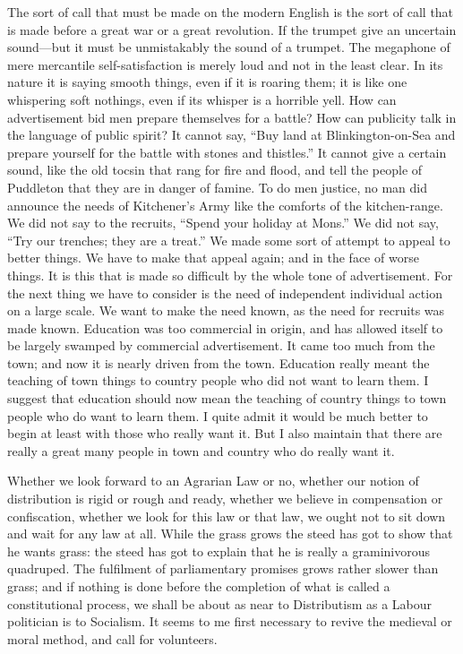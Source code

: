 \documentclass{book}
\begin{document}
The sort of call that must be made on the modern English is the sort of call that is made before a great war or a great revolution. If the trumpet give an uncertain sound—but it must be unmistakably the sound of a trumpet. The megaphone of mere mercantile self-satisfaction is merely loud and not in the least clear. In its nature it is saying smooth things, even if it is roaring them; it is like one whispering soft nothings, even if its whisper is a horrible yell. How can advertisement bid men prepare themselves for a battle? How can publicity talk in the language of public spirit? It cannot say, “Buy land at Blinkington-on-Sea and prepare yourself for the battle with stones and thistles.” It cannot give a certain sound, like the old tocsin that rang for fire and flood, and tell the people of Puddleton that they are in danger of famine. To do men justice, no man did announce the needs of Kitchener’s Army like the comforts of the kitchen-range. We did not say to the recruits, “Spend your holiday at Mons.” We did not say, “Try our trenches; they are a treat.” We made some sort of attempt to appeal to better things. We have to make that appeal again; and in the face of worse things. It is this that is made so difficult by the whole tone of advertisement. For the next thing we have to consider is the need of independent individual action on a large scale. We want to make the need known, as the need for recruits was made known. Education was too commercial in origin, and has allowed itself to be largely swamped by commercial advertisement. It came too much from the town; and now it is nearly driven from the town. Education really meant the teaching of town things to country people who did not want to learn them. I suggest that education should now mean the teaching of country things to town people who do want to learn them. I quite admit it would be much better to begin at least with those who really want it. But I also maintain that there are really a great many people in town and country who do really want it.

Whether we look forward to an Agrarian Law or no, whether our notion of distribution is rigid or rough and ready, whether we believe in compensation or confiscation, whether we look for this law or that law, we ought not to sit down and wait for any law at all. While the grass grows the steed has got to show that he wants grass: the steed has got to explain that he is really a graminivorous quadruped. The fulfilment of parliamentary promises grows rather slower than grass; and if nothing is done before the completion of what is called a constitutional process, we shall be about as near to Distributism as a Labour politician is to Socialism. It seems to me first necessary to revive the medieval or moral method, and call for volunteers.
\end{document}
